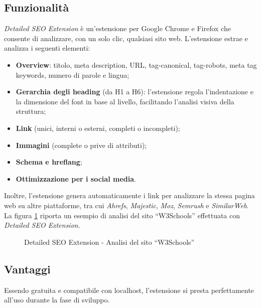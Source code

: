\subsection{Funzionalità}
\par \textit{Detailed SEO Extension} è un'estensione per Google Chrome e Firefox che consente di analizzare, con un solo clic, qualsiasi sito web. L'estensione estrae e analizza i seguenti elementi:
\begin{itemize}
    \item \textbf{Overview}: titolo, meta description, URL, \gls{tag-canonical}, \gls{tag-robots}, meta tag keywords, numero di parole e lingua;
    \item \textbf{Gerarchia degli heading} (da H1 a H6): l'estensione regola l'indentazione e la dimensione del font in base al livello, facilitando l'analisi visiva della struttura;
    \item \textbf{Link} (unici, interni o esterni, completi o incompleti);
    \item \textbf{Immagini} (complete o prive di attributi);
    \item \textbf{Schema e \gls{hreflang}};
    \item \textbf{Ottimizzazione per i social media}.
\end{itemize}
\vspace{5pt}
\par\noindent Inoltre, l'estensione genera automaticamente i link per analizzare la stessa pagina web su altre piattaforme, tra cui \textit{Ahrefs}, \textit{Majestic}, \textit{Moz}, \textit{Semrush} e \textit{SimilarWeb}. La figura \ref{fig:detailed_seo_extension_w3schools} riporta un esempio di analisi del sito “W3Schools” effettuata con \textit{Detailed SEO Extension}.
 
\begin{figure}[H]
    \centering 
    \caption{Detailed SEO Extension - Analisi del sito “W3Schools”}
    \label{fig:detailed_seo_extension_w3schools}
\end{figure}

\subsection{Vantaggi}
\par Essendo gratuita e compatibile con \gls{localhost}, l'estensione si presta perfettamente all'uso durante la fase di sviluppo.

